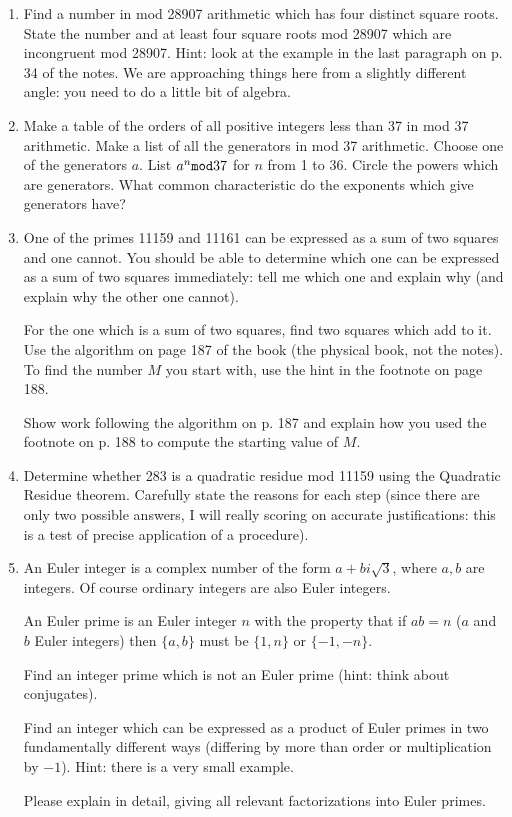 \documentclass[12pt]{article}
\begin{document}
\begin{enumerate}
\newpage

\item  Find a number in mod 28907 arithmetic which has four distinct square roots.  State the number and at least four square roots mod 28907 which are incongruent mod 28907.   Hint:  look at the example in the last paragraph on p. 34 of the notes.  We are approaching things here from a slightly different angle:  you need to do a little bit of algebra.


\newpage

\item  Make a table of the orders of all positive integers less than 37 in mod 37 arithmetic.  Make a list of all the generators in mod 37 arithmetic.  Choose one of the generators $a$.
List $a^n{\tt mod} 37$ for $n$ from 1 to 36.  Circle the powers which are generators.  What common characteristic do the exponents which give generators have?

\newpage

\item  One of the primes  11159 and 11161 can be expressed as a sum of two squares and one cannot.  You should be able to determine which one can be expressed as a sum of two
squares immediately:  tell me which one and explain why (and explain why the other one cannot).

For the one which is a sum of two squares, find two squares which add to it.  Use the algorithm on page 187 of the book (the physical book, not the notes).  To find the number $M$ you start with, use the hint in the footnote on page 188.

Show work following the algorithm on p. 187 and explain how you used the footnote on p. 188 to compute the starting value of $M$.

\newpage

\item  Determine whether 283 is a quadratic residue mod 11159 using the Quadratic Residue theorem.  Carefully state the reasons for each step (since there are only two
possible answers, I will really scoring on accurate justifications:  this is a test of precise application of a procedure).

\newpage

\item  An Euler integer is a complex number of the form $a+bi\sqrt 3$, where $a,b$ are integers.  Of course ordinary integers are also Euler integers.

An Euler prime is an Euler integer $n$ with the property that if $ab=n$ ($a$ and $b$ Euler integers) then $\{a,b\}$ must be $\{1,n\}$ or $\{-1,-n\}$.

Find an integer prime which is not an Euler prime (hint:  think about conjugates).

Find an integer which can be expressed as a product of Euler primes in two fundamentally different ways (differing by more than order or multiplication by $-1$).  Hint:  there is a very small example.

Please explain in detail, giving all relevant factorizations into Euler primes.

\newpage

\end{enumerate}
\end{document}
